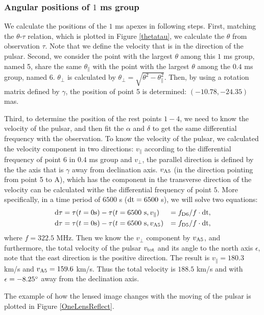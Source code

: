 \documentclass[useAMS,usenatbib]{mn2e}
\begin{document}
\subsubsection{Angular positions of $1$ ms group}
We calculate the positions of the $1$ ms apexes in following steps. First, matching the $\theta$-$\tau$ relation, which is plotted in Figure \ref{thetatau}, we calculate the $\theta$ from observation $\tau$. Note that we define the velocity that is in the direction of the pulsar. Second, we consider the point with the largest $\theta$ among this $1$ ms group, named 5, share the same $\theta_{\parallel}$ with the point with the largest $\theta$ among the $0.4$ ms group, named 6. $\theta_{\bot}$ is calculated by $\theta_{\bot}=\sqrt{\theta^2-\theta_{\parallel} ^2} $. Then, by using a rotation matrix defined by $\gamma$, the position of point 5 is determined: $(-10.78,-24.35)$ mas. 

Third, to determine the position of the rest points $1-4$, we need to know the velocity of the pulsar, and then fit the $\alpha$ and $\delta$ to get the same differential frequency with the observation. To know the velocity of the pulsar, we calculated the velocity component in two directions: $v_{\parallel}$ according to the differential frequency of point $6$ in $0.4$ ms group and $v_{\bot}$, the parallel direction is defined by the the axis that is $\gamma$ away from declination axis. $v_{\rm A5}$ (in the direction pointing from point 5 to A), which has the component in the transverse direction of the velocity can be calculated withe the differential frequency of point $5$. More specifically, in a time period of $6500$ s ($\rm dt=6500$ s), we will solve two equations: 
\begin{align*}
{\rm d\tau}&=\tau(t=0{\rm s})-\tau(t=6500~{\rm s},v_{\parallel})&=f_{\rm D6}/f\cdot{\rm dt},\\
{\rm d\tau}&=\tau(t=0 {\rm s}) -\tau(t=6500~{\rm s}, v_{\rm A5}) & = f_{\rm D5} /f\cdot{\rm dt},
\end{align*}
where $f=322.5$ MHz. Then we know the $v_{\bot}$ component by $v_{\rm A5}$, and furthermore, the total velocity of the pulsar $v_{\rm tot}$ and its angle to the north axis $\epsilon$, note that the east direction is the positive direction. The result is $v_{\parallel}=180.3$ km/s and $v_{\rm A5}=159.6$ km/s. Thus the total velocity is $188.5$ km/s and with $\epsilon=-8.25\degree$  away from the declination axis.

The example of how the lensed image changes with the moving of the pulsar is plotted in Figure \ref{OneLensReflect}. 
\end{document}

